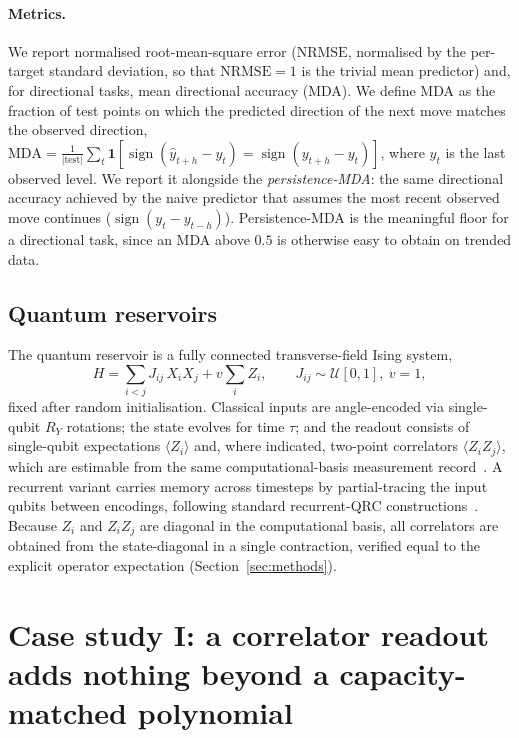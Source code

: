 \documentclass[11pt,a4paper]{article}
\newcommand{\nrmse}{\mathrm{NRMSE}}
\begin{document}
\paragraph{Metrics.} We report normalised root-mean-square error
($\nrmse$, normalised by the per-target standard deviation, so that
$\nrmse=1$ is the trivial mean predictor) and, for directional tasks, mean
directional accuracy (MDA). We define MDA as the fraction of test points on
which the predicted direction of the next move matches the observed direction,
$\mathrm{MDA}=\frac{1}{|\mathrm{test}|}\sum_t \mathbf{1}\!\left[\operatorname{sign}(\hat y_{t+h}-y_t)=\operatorname{sign}(y_{t+h}-y_t)\right]$,
where $y_t$ is the last observed level. We report it alongside the
\emph{persistence-MDA}: the same directional accuracy achieved by the naive
predictor that assumes the most recent observed move continues
($\operatorname{sign}(y_t-y_{t-h})$). Persistence-MDA is the meaningful floor
for a directional task, since an MDA above $0.5$ is otherwise easy to obtain on
trended data.

\subsection{Quantum reservoirs}

The quantum reservoir is a fully connected transverse-field Ising system,
\begin{equation}
H = \sum_{i<j} J_{ij}\, X_i X_j + v \sum_i Z_i,
\qquad J_{ij}\sim\mathcal{U}[0,1],\ v=1,
\end{equation}
fixed after random initialisation. Classical inputs are angle-encoded via
single-qubit $R_Y$ rotations; the state evolves for time $\tau$; and the readout
consists of single-qubit expectations $\langle Z_i\rangle$ and, where indicated,
two-point correlators $\langle Z_i Z_j\rangle$, which are estimable from the same
computational-basis measurement record~\cite{huang2020}. A recurrent variant
carries memory across timesteps by partial-tracing the input qubits between
encodings, following standard recurrent-QRC constructions~\cite{nakajima2019}. Because $Z_i$ and $Z_iZ_j$
are diagonal in the computational basis, all correlators are obtained from the
state-diagonal in a single contraction, verified equal to the explicit operator
expectation (Section~\ref{sec:methods}).

\section{Case study I: a correlator readout adds nothing beyond a
capacity-matched polynomial}
\label{sec:corr}
\end{document}
